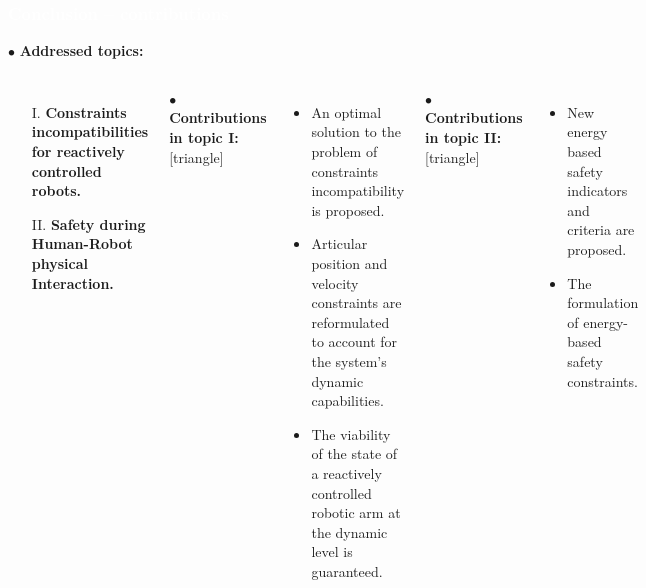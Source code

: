\begin{frame}[noframenumbering]
\frametitle{{\textcolor{white}{\hspace{0.3cm}Conclusion -- contributions}}}


\hspace{-6mm}
$\bullet$ {\color{blue-violet}\textbf{Addressed topics:}}
\begin{columns}
\column{\paperwidth-10mm}
\begin{itemize}
\item[I.]  {\color{red}\textbf{Constraints incompatibilities for reactively controlled robots.}}
\item[II.] {\color{red}\textbf{Safety during Human-Robot physical Interaction.}}
\end{itemize}
\vspace{5mm}

$\bullet$ {\color{ao(english)}\textbf{Contributions in topic I:}}
[triangle] 
\begin{itemize}
\item An optimal solution to the problem of constraints incompatibility is proposed.

\item Articular position and velocity constraints are reformulated to account for the system's dynamic capabilities.

\item The viability of the state of a reactively controlled robotic arm at the dynamic level is guaranteed.

\end{itemize}
\vspace{5mm}

$\bullet$ {\color{ao(english)}\textbf{Contributions in topic II:}}
[triangle] 
\begin{itemize}
\item New energy based safety indicators and criteria are proposed.

\item The formulation of energy-based safety constraints.


\end{itemize}
\end{columns}
\end{frame}







